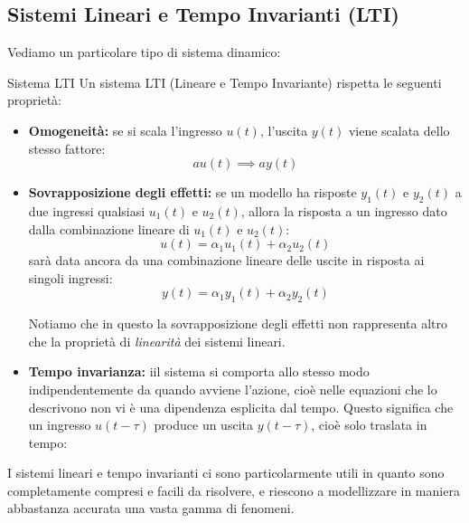 \documentclass[a4paper,11pt]{article}
\begin{document}
\subsection{Sistemi Lineari e Tempo Invarianti (LTI)}
Vediamo un particolare tipo di sistema dinamico:
\begin{definition}{Sistema LTI}
	Un sistema LTI (Lineare e Tempo Invariante) rispetta le seguenti proprietà:
	\begin{itemize}
		\item \textbf{Omogeneità:} se si scala l'ingresso $u(t)$, l'uscita $y(t)$ viene scalata dello stesso fattore:
			$$
				au(t) \implies ay(t)
			$$

		\item \textbf{Sovrapposizione degli effetti:} se un modello ha risposte $y_1(t)$ e $y_2(t)$ a due ingressi qualsiasi $u_1(t)$ e $u_2(t)$, allora la risposta a un ingresso dato dalla combinazione lineare di $u_1(t)$ e $u_2(t)$:
			$$
				u(t) = \alpha_1 u_1(t) + \alpha_2 u_2(t)
			$$
			sarà data ancora da una combinazione lineare delle uscite in risposta ai singoli ingressi:
			$$
				y(t) = \alpha_1 y_1(t) + \alpha_2 y_2(t)
			$$
			
			Notiamo che in questo la sovrapposizione degli effetti non rappresenta altro che la proprietà di \textit{linearità} dei sistemi lineari.
	
		\item \textbf{Tempo invarianza:} iil sistema si comporta allo stesso modo indipendentemente da quando avviene l'azione, cioè nelle equazioni che lo descrivono non vi è una dipendenza esplicita dal tempo.
			Questo significa che un ingresso $u(t - \tau)$ produce un uscita $y(t - \tau)$, cioè solo traslata in tempo:

		\begin{center}
		\end{center}
	\end{itemize}
\end{definition}

I sistemi lineari e tempo invarianti ci sono particolarmente utili in quanto sono completamente compresi e facili da risolvere, e riescono a modellizzare in maniera abbastanza accurata una vasta gamma di fenomeni.
\end{document}
